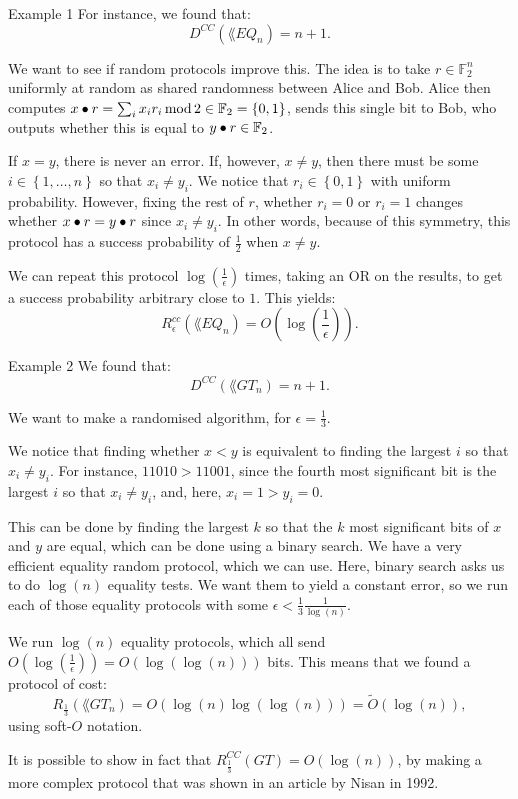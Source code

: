 \documentclass[a4paper]{article}
\begin{document}
\begin{parag}{Example 1}
    For instance, we found that: 
    \[D^{CC}\left(\lang{EQ}_n\right) = n + 1.\]

    We want to see if random protocols improve this. The idea is to take $r \in \mathbb{F}_2^n$ uniformly at random as shared randomness between Alice and Bob. Alice then computes $x\dotprod r = \sum_{i} x_i r_i \Mod 2 \in \mathbb{F}_2 = \left\{0, 1\right\}$, sends this single bit to Bob, who outputs whether this is equal to $y \bullet r \in \mathbb{F}_2$.

    If $x = y$, there is never an error. If, however, $x \neq y$, then there must be some $i \in \left\{1, \ldots, n\right\}$ so that $x_i \neq y_i$. We notice that $r_i \in \left\{0, 1\right\}$ with uniform probability. However, fixing the rest of $r$, whether $r_i = 0$ or $r_i = 1$ changes whether $x \bullet r = y\bullet r$ since $x_i \neq y_i$. In other words, because of this symmetry, this protocol has a success probability of $\frac{1}{2}$ when $x \neq y$.

    We can repeat this protocol $\log\left(\frac{1}{\epsilon}\right)$ times, taking an OR on the results, to get a success probability arbitrary close to $1$. This yields:
    \[R_{\epsilon}^{cc}\left(\lang{EQ}_n\right) = O\left(\log\left(\frac{1}{\epsilon}\right)\right).\]
\end{parag}

\begin{parag}{Example 2}
    We found that: 
    \[D^{CC}\left(\lang{GT}_n\right) = n + 1.\]

    We want to make a randomised algorithm, for $\epsilon = \frac{1}{3}$.

    We notice that finding whether $x < y$ is equivalent to finding the largest $i$ so that $x_i \neq y_i$. For instance, $11010 > 11001$, since the fourth most significant bit is the largest $i$ so that $x_i \neq y_i$, and, here, $x_i = 1 > y_i = 0$.
    
    This can be done by finding the largest $k$ so that the $k$ most significant bits of $x$ and $y$ are equal, which can be done using a binary search. We have a very efficient equality random protocol, which we can use. Here, binary search asks us to do $\log\left(n\right)$ equality tests. We want them to yield a constant error, so we run each of those equality protocols with some $\epsilon < \frac{1}{3} \frac{1}{\log\left(n\right)}$. 

    We run $\log\left(n\right)$ equality protocols, which all send $O\left(\log\left(\frac{1}{\epsilon}\right)\right) = O\left(\log\left(\log\left(n\right)\right)\right)$ bits. This means that we found a protocol of cost: 
    \[R_{\frac{1}{3}}\left(\lang{GT}_n\right) = O\left(\log\left(n\right)\log\left(\log\left(n\right)\right)\right) = \widetilde{O}\left(\log\left(n\right)\right),\]
    using soft-$O$ notation.
    
    It is possible to show in fact that $R_{\frac{1}{3}}^{CC}\left(GT\right) = O\left(\log\left(n\right)\right)$, by making a more complex protocol that was shown in an article by Nisan in 1992.
\end{parag}
\end{document}
